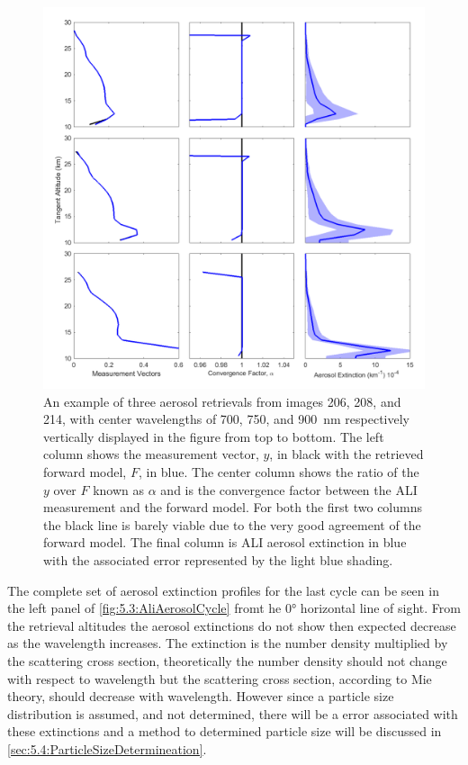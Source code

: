 \begin{figure}
\includegraphics[width=1.0\textwidth]{./Images/5-3-AliRetreivals.pdf}
    \caption[ALI Aerosol Retrievals]{An example of three aerosol retrievals from images 206, 208, and 214, with center wavelengths of 700, 750, and 900~nm respectively vertically displayed in the figure from top to bottom. The left column shows the measurement vector, $y$, in black with the retrieved forward model, $F$, in blue. The center column shows the ratio of the $y$ over $F$ known as $\alpha$ and is the convergence factor between the ALI measurement and the forward model. For both the first two columns the black line is barely viable due to the very good agreement of the forward model. The final column is ALI aerosol extinction in blue with the associated error represented by the light blue shading.}
    \label{fig:5.3:AliRetreivals}
\end{figure}

The complete set of aerosol extinction profiles for the last cycle can be seen in the left panel of \autoref{fig:5.3:AliAerosolCycle} fromt he 0\si{\degree} horizontal line of sight. From the retrieval altitudes the aerosol extinctions do not show then expected decrease as the wavelength increases. The extinction is the number density multiplied by the scattering cross section, theoretically the number density should not change with respect to wavelength but the scattering cross section, according to Mie theory, should decrease with wavelength. However since a particle size distribution is assumed, and not determined, there will be a error associated with these extinctions and a method to determined particle size will be discussed in \autoref{sec:5.4:ParticleSizeDetermineation}.

